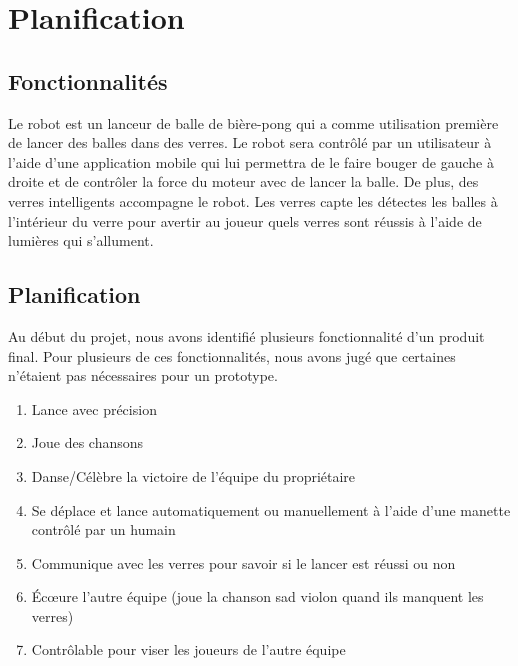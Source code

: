 \section{Planification}


\subsection{Fonctionnalités}

Le robot est un lanceur de balle de bière-pong qui a comme utilisation première de lancer des balles dans des verres.
Le robot sera contrôlé par un utilisateur à l’aide d’une application mobile qui lui permettra de le faire bouger de gauche à droite et de contrôler la force du moteur avec de lancer la balle.
De plus, des verres intelligents accompagne le robot.
Les verres capte les détectes les balles à l’intérieur du verre pour avertir au joueur quels verres sont réussis à l’aide de lumières qui s’allument.

\subsection{Planification}



Au début du projet, nous avons identifié plusieurs fonctionnalité d'un produit final.
Pour plusieurs de ces fonctionnalités, nous avons jugé que certaines n'étaient pas nécessaires pour un prototype.

\begin{enumerate}
    \item Lance avec précision
    \item Joue des chansons
    \item Danse/Célèbre la victoire de l’équipe du propriétaire
    \item Se déplace et lance automatiquement ou manuellement à l’aide d’une manette contrôlé par un humain
    \item Communique avec les verres pour savoir si le lancer est réussi ou non
    \item Écœure l’autre équipe (joue la chanson sad violon quand ils manquent les verres)
    \item Contrôlable pour viser les joueurs de l’autre équipe
\end{enumerate}


